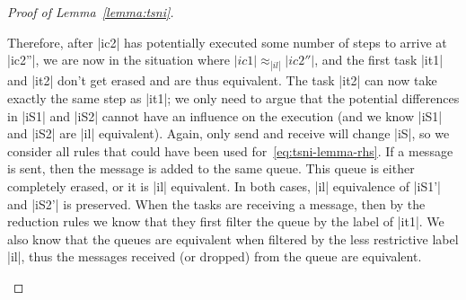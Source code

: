 {\begin{proof}[Proof of Lemma~\ref{lemma:tsni}]
\begin{itemize}
    Therefore, after |ic2| has potentially executed some number of steps
    to arrive at |ic2''|, we are now in the situation where $|ic1|\approx_{|il|}|ic2''|$, and the first task |it1| and |it2| don't
    get erased and are thus equivalent.
    The task |it2| can now take exactly the same step as |it1|;  we only
    need to argue that the potential differences in |iS1| and |iS2| cannot
    have an influence on the execution (and we know |iS1| and |iS2| are
    |il| equivalent).
    Again, only send and receive will change |iS|, so we consider all
    rules that could have been used for~\eqref{eq:tsni-lemma-rhs}.  If
    a message is sent, then the message is added to the same queue.  This
    queue is either completely erased, or it is |il| equivalent.  In both
    cases, |il| equivalence of |iS1'| and |iS2'| is preserved.
    When the tasks are receiving a message, then by the reduction rules
    we know that they first filter the queue by the label of |it1|.  We
    also know that the queues are equivalent when filtered by the less
    restrictive label |il|, thus the messages received (or dropped) from the
    queue are equivalent.
  \end{itemize}
\end{proof}
}
